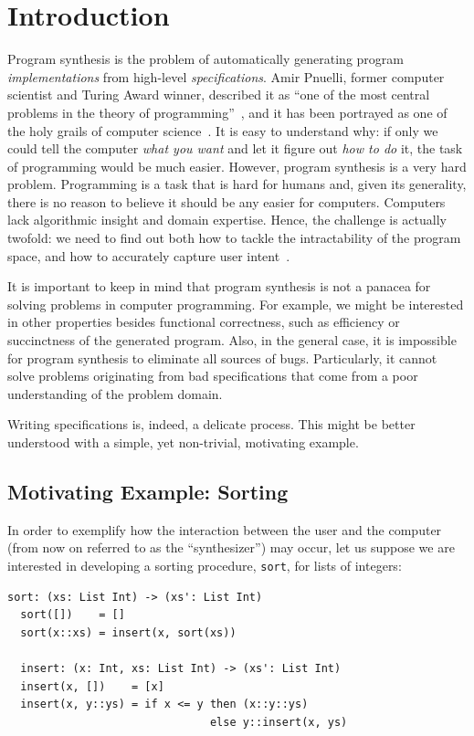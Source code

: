 \chapter{Introduction}
\label{chapter:introduction}

Program synthesis is the problem of automatically generating program
\textit{implementations} from high-level \textit{specifications}.
Amir Pnuelli, former computer scientist and Turing Award winner, described it as
``one of the most central problems in the theory of
programming''~\cite{Pnueli:1989:ARM}, and it has been portrayed as one of the
holy grails of computer science~\cite{Solar-Lezama:2008,Gulwani2017}.
It is easy to understand why: if only we could tell the computer \textit{what you
want} and let it figure out \textit{how to do} it, the task of programming would
be much easier.
However, program synthesis is a very hard problem.
Programming is a task that is hard for humans and, given its generality,
there is no reason to believe it should be any easier for computers.
Computers lack algorithmic insight and domain expertise.
Hence, the challenge is actually twofold: we need to find out both how to
tackle the intractability of the program space, and how to accurately capture
user intent~\cite{Gulwani2017}.

It is important to keep in mind that program synthesis is not a panacea for
solving problems in computer programming.
For example, we might be interested in other properties besides functional
correctness, such as efficiency or succinctness of the generated program.
Also, in the general case, it is impossible for program synthesis to eliminate
all sources of bugs.
Particularly, it cannot solve problems originating from bad specifications
that come from a poor understanding of the problem domain.

Writing specifications is, indeed, a delicate process.
This might be better understood with a simple, yet non-trivial, motivating
example.

\section{Motivating Example: Sorting}
\label{sec:sorting-example}

In order to exemplify how the interaction between the user and the computer
(from now on referred to as the ``synthesizer'') may occur, let us suppose we
are interested in developing a sorting procedure, \lstinline{sort}, for lists of
integers:

\begin{lstlisting}[xleftmargin=.2\textwidth]
  sort: (xs: List Int) -> (xs': List Int)
  sort([])    = []
  sort(x::xs) = insert(x, sort(xs))

  insert: (x: Int, xs: List Int) -> (xs': List Int)
  insert(x, [])    = [x]
  insert(x, y::ys) = if x <= y then (x::y::ys)
                               else y::insert(x, ys)
\end{lstlisting}

